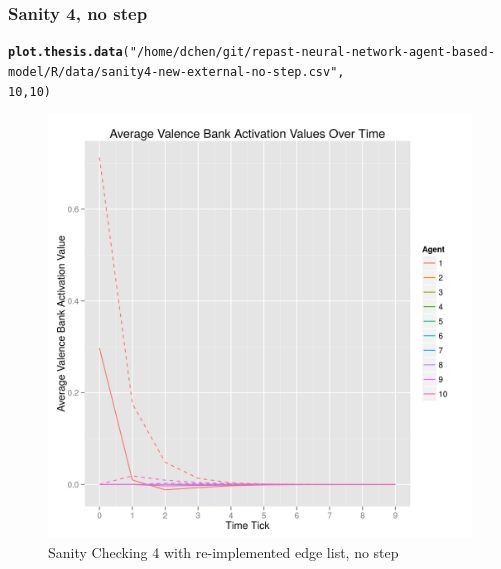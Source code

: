 \documentclass{article}\usepackage[]{graphicx}\usepackage[]{color}
\makeatletter
\def\maxwidth{ %
  \ifdim\Gin@nat@width>\linewidth
    \linewidth
  \else
    \Gin@nat@width
  \fi
}
\newcommand{\hlnum}[1]{\textcolor[rgb]{0.686,0.059,0.569}{#1}}%
\newcommand{\hlstr}[1]{\textcolor[rgb]{0.192,0.494,0.8}{#1}}%
\newcommand{\hlstd}[1]{\textcolor[rgb]{0.345,0.345,0.345}{#1}}%
\newcommand{\hlkwd}[1]{\textcolor[rgb]{0.737,0.353,0.396}{\textbf{#1}}}%
\newenvironment{kframe}{%
 \def\at@end@of@kframe{}%
 \ifinner\ifhmode%
  \def\at@end@of@kframe{\end{minipage}}%
  \begin{minipage}{\columnwidth}%
 \fi\fi%
 \def\FrameCommand##1{\hskip\@totalleftmargin \hskip-\fboxsep
 \colorbox{shadecolor}{##1}\hskip-\fboxsep
     \hskip-\linewidth \hskip-\@totalleftmargin \hskip\columnwidth}%
 \MakeFramed {\advance\hsize-\width
   \@totalleftmargin\z@ \linewidth\hsize
   \@setminipage}}%
 {\par\unskip\endMakeFramed%
 \at@end@of@kframe}
\newenvironment{knitrout}{}{} %
\makeatother
\begin{document}
\subsubsection{Sanity 4, no step}
\begin{knitrout}
\color{fgcolor}\begin{kframe}
\begin{alltt}
\hlkwd{plot.thesis.data}\hlstd{(}\hlstr{"/home/dchen/git/repast-neural-network-agent-based-model/R/data/sanity4-new-external-no-step.csv"}\hlstd{,}
    \hlnum{10}\hlstd{,} \hlnum{10}\hlstd{)}
\end{alltt}
\end{kframe}\begin{figure}[]

\includegraphics[width=\maxwidth]{figure/plot-sanity-4-v2-nostep} \caption[Sanity Checking 4 with re-implemented edge list, no step]{Sanity Checking 4 with re-implemented edge list, no step\label{fig:plot-sanity-4-v2-nostep}}
\end{figure}


\end{knitrout}


\newpage
\end{document}
